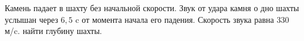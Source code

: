 Камень падает в шахту без начальной скорости.
Звук от удара камня о дно шахты услышан через $6,5$ c от момента начала его падения.
Скорость звука равна $330$ м/c. найти глубину шахты.
 
